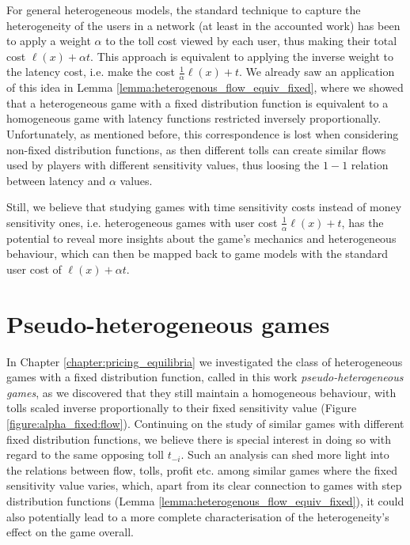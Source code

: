 \documentclass[10pt,a4paper]{book}
\theoremstyle{definition}
\theoremstyle{comment}
\begin{document}
For general heterogeneous models, the standard technique to capture the heterogeneity of the users in a network (at least in the accounted work) has been to apply a weight $\alpha$ to the toll cost viewed by each user, thus making their total cost $\ell(x) + \alpha t$.
This approach is equivalent to applying the inverse weight to the latency cost, i.e. make the cost $\tfrac1\alpha \ell(x) + t$.
We already saw an application of this idea in Lemma \ref{lemma:heterogenous_flow_equiv_fixed}, where we showed that a heterogeneous game with a fixed distribution function is equivalent to a homogeneous game with latency functions restricted inversely proportionally.
Unfortunately, as mentioned before, this correspondence is lost when considering non-fixed distribution functions, as then different tolls can create similar flows used by players with different sensitivity values, thus loosing the $1-1$ relation between latency and $\alpha$ values.

Still, we believe that studying games with time sensitivity costs instead of money sensitivity ones, i.e. heterogeneous games with user cost $\tfrac1\alpha \ell(x) + t$, has the potential to reveal more insights about the game's mechanics and heterogeneous behaviour, which can then be mapped back to game models with the standard user cost of $\ell(x) + \alpha t$.

\section*{Pseudo-heterogeneous games}

In Chapter \ref{chapter:pricing_equilibria} we investigated the class of heterogeneous games with a fixed distribution function, called in this work \textit{pseudo-heterogeneous games}, as we discovered that they still maintain a homogeneous behaviour, with tolls scaled inverse proportionally to their fixed sensitivity value (Figure \ref{figure:alpha_fixed:flow}).
Continuing on the study of similar games with different fixed distribution functions, we believe there is special interest in doing so with regard to the same opposing toll $t_{-i}$.
Such an analysis can shed more light into the relations between flow, tolls, profit etc. among similar games where the fixed sensitivity value varies, which, apart from its clear connection to games with step distribution functions (Lemma \ref{lemma:heterogenous_flow_equiv_fixed}), it could also potentially lead to a more complete characterisation of the heterogeneity's effect on the game overall.
\end{document}
